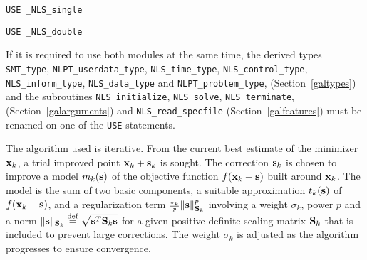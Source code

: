 \documentclass{galahad}
\newcommand{\packagename}{NLS}
\newcommand{\fullpackagename}{\libraryname\_\packagename}
\begin{document}
\hspace{8mm} {\tt USE \fullpackagename\_single}

\medskip{}

\hspace{8mm} {\tt USE  \fullpackagename\_double}

\medskip

\noindent
If it is required to use both modules at the same time, the derived types
{\tt SMT\_type},
{\tt NLPT\_userdata\_type},
{\tt \packagename\_time\_\-type},
{\tt \packagename\_control\_type},
{\tt \packagename\_inform\_type},
{\tt \packagename\_data\_type}
and
{\tt NLPT\_problem\_type},
(Section~\ref{galtypes})
and the subroutines
{\tt \packagename\_initialize},
{\tt \packagename\_\-solve},
{\tt \packagename\_terminate},
(Section~\ref{galarguments})
and
{\tt \packagename\_read\_specfile}
(Section~\ref{galfeatures})
must be renamed on one of the {\tt USE} statements.


\galterminology
The algorithm used is iterative. From the current best estimate
of the minimizer ${\mathbf{x}}_k$, a trial improved point ${\mathbf{x}}_k + {\mathbf{s}}_k$ is sought.
The correction ${\mathbf{s}}_k$ is chosen to improve a model $m_k({\mathbf{s}})$ of
the objective function $f({\mathbf{x}}_k+{\mathbf{s}})$ built around
${\mathbf{x}}_k$. The model is the sum of two basic components,
a suitable approximation $t_k({\mathbf{s}})$ of $f({\mathbf{x}}_k+{\mathbf{s}})$,
and a regularization term ${\scriptstyle \frac{\sigma_k}{p}} \|{\mathbf{s}}\|_{{\mathbf{S}}_k}^p$
involving a weight $\sigma_k$, power $p$ and
a norm $\|{\mathbf{s}}\|_{{\mathbf{S}}_k} \stackrel{\rm def}{=} \sqrt{{\mathbf{s}}^T {\mathbf{S}}_k {\mathbf{s}}}$ for a given positive
definite scaling matrix ${\mathbf{S}}_k$ that is included to prevent large corrections.
The weight  $\sigma_k$ is adjusted as the algorithm progresses to
ensure convergence.
\end{document}
